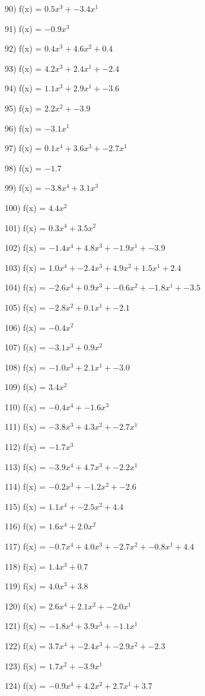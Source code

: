 \documentclass[10pt,a4paper]{article}
\begin{document}
90) f(x) = $0.5x^3 + -3.4x^1$

91) f(x) = $-0.9x^3$

92) f(x) = $0.4x^3 + 4.6x^2 + 0.4$

93) f(x) = $4.2x^3 + 2.4x^1 + -2.4$

94) f(x) = $1.1x^3 + 2.9x^1 + -3.6$

95) f(x) = $2.2x^2 + -3.9$

96) f(x) = $-3.1x^1$

97) f(x) = $0.1x^4 + 3.6x^3 + -2.7x^1$

98) f(x) = $-1.7$

99) f(x) = $-3.8x^4 + 3.1x^3$

100) f(x) = $4.4x^2$

101) f(x) = $0.3x^4 + 3.5x^2$

102) f(x) = $-1.4x^4 + 4.8x^3 + -1.9x^1 + -3.9$

103) f(x) = $1.0x^4 + -2.4x^3 + 4.9x^2 + 1.5x^1 + 2.4$

104) f(x) = $-2.6x^4 + 0.9x^3 + -0.6x^2 + -1.8x^1 + -3.5$

105) f(x) = $-2.8x^2 + 0.1x^1 + -2.1$

106) f(x) = $-0.4x^2$

107) f(x) = $-3.1x^3 + 0.9x^2$

108) f(x) = $-1.0x^3 + 2.1x^1 + -3.0$

109) f(x) = $3.4x^2$

110) f(x) = $-0.4x^4 + -1.6x^3$

111) f(x) = $-3.8x^3 + 4.3x^2 + -2.7x^1$

112) f(x) = $-1.7x^3$

113) f(x) = $-3.9x^4 + 4.7x^3 + -2.2x^1$

114) f(x) = $-0.2x^3 + -1.2x^2 + -2.6$

115) f(x) = $1.1x^4 + -2.5x^2 + 4.4$

116) f(x) = $1.6x^4 + 2.0x^2$

117) f(x) = $-0.7x^4 + 4.0x^3 + -2.7x^2 + -0.8x^1 + 4.4$

118) f(x) = $1.4x^3 + 0.7$

119) f(x) = $4.0x^3 + 3.8$

120) f(x) = $2.6x^4 + 2.1x^2 + -2.0x^1$

121) f(x) = $-1.8x^4 + 3.9x^3 + -1.1x^1$

122) f(x) = $3.7x^4 + -2.4x^3 + -2.9x^2 + -2.3$

123) f(x) = $1.7x^2 + -3.9x^1$

124) f(x) = $-0.9x^4 + 4.2x^2 + 2.7x^1 + 3.7$
\end{document}
